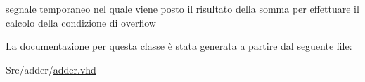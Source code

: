 segnale temporaneo nel quale viene posto il risultato della somma per effettuare il calcolo della condizione di overflow 

La documentazione per questa classe è stata generata a partire dal seguente file\+:\begin{DoxyCompactItemize}
\item 
Src/adder/\hyperlink{adder_8vhd}{adder.\+vhd}\end{DoxyCompactItemize}
